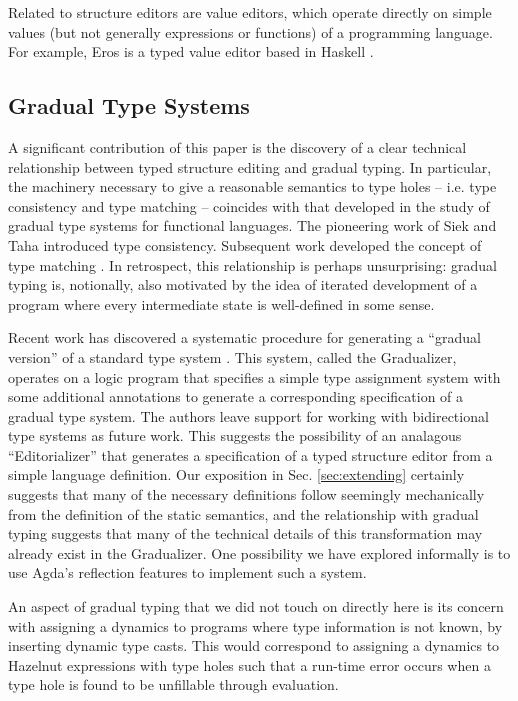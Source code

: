 \documentclass[preprint,9pt]{sigplanconf}
\begin{document}
Related to structure editors are value editors, which operate directly on simple values (but not generally expressions or functions) of a programming language. For example, Eros is a typed value editor based in Haskell \cite{DBLP:conf/icfp/Elliott07}.


\subsection{Gradual Type Systems}
A significant contribution of this paper is the discovery of a clear technical relationship between typed structure editing and gradual typing. In particular, the machinery necessary to give a reasonable semantics to type holes -- i.e. type consistency and type matching -- coincides with that developed in the study of gradual type systems for functional languages. The pioneering work of Siek and Taha \cite{Siek06a} introduced type consistency. Subsequent work developed the concept of type matching \cite{DBLP:conf/popl/RastogiCH12,DBLP:conf/popl/GarciaC15}. In retrospect, this relationship is perhaps unsurprising: gradual typing is, notionally, also motivated by the idea of iterated development of a program where every intermediate state is well-defined in some sense. %

Recent work has discovered a systematic procedure for generating a ``gradual version'' of a standard type system \cite{DBLP:conf/popl/CiminiS16}. This system, called the Gradualizer, operates on a logic program that specifies a simple type assignment system with some additional annotations to generate a corresponding specification of a gradual type system. The authors leave support for working with bidirectional type systems as future work. This suggests the possibility of an analagous ``Editorializer'' that generates a specification of a typed structure editor from a simple language definition. Our exposition in Sec. \ref{sec:extending} certainly suggests that many of the necessary definitions follow seemingly mechanically from the definition of the static semantics, and the relationship with gradual typing suggests that many of the technical details of this transformation may already exist in the Gradualizer. One possibility we have explored informally is to use Agda's reflection features to implement such a system.

An aspect of gradual typing that we did not touch on directly here is its concern with  assigning a dynamics to programs where type information is not known, by inserting dynamic type casts. This would correspond to assigning a dynamics to Hazelnut expressions with type holes such that a run-time error occurs when a type hole is found to be unfillable through evaluation.
\end{document}
